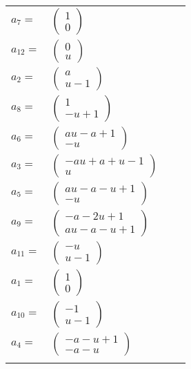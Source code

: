 \documentclass[1p]{elsarticle_modified}
\theoremstyle{definition}
\begin{document}
\begin{tabular}{m{7pt} m{180pt} m{7pt} m{180pt} }
\flushright $a_{7}=$&$\begin{pmatrix}1\\0\end{pmatrix}$ \\
\flushright $a_{12}=$&$\begin{pmatrix}0\\u\end{pmatrix}$ \\
\flushright $a_{2}=$&$\begin{pmatrix}a\\u-1\end{pmatrix}$ \\
\flushright $a_{8}=$&$\begin{pmatrix}1\\- u+1\end{pmatrix}$ \\
\flushright $a_{6}=$&$\begin{pmatrix}a u- a+1\\- u\end{pmatrix}$ \\
\flushright $a_{3}=$&$\begin{pmatrix}- a u+a+u-1\\u\end{pmatrix}$ \\
\flushright $a_{5}=$&$\begin{pmatrix}a u- a- u+1\\- u\end{pmatrix}$ \\
\flushright $a_{9}=$&$\begin{pmatrix}- a-2 u+1\\a u- a- u+1\end{pmatrix}$ \\
\flushright $a_{11}=$&$\begin{pmatrix}- u\\u-1\end{pmatrix}$ \\
\flushright $a_{1}=$&$\begin{pmatrix}1\\0\end{pmatrix}$ \\
\flushright $a_{10}=$&$\begin{pmatrix}-1\\u-1\end{pmatrix}$ \\
\flushright $a_{4}=$&$\begin{pmatrix}- a- u+1\\- a- u\end{pmatrix}$\\&\end{tabular}
\end{document}
